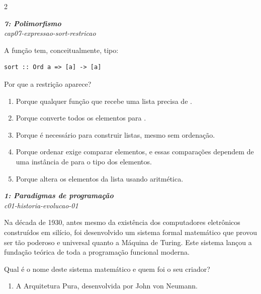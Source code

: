 \documentclass[a4paper,10pt,brazil]{article}
\begin{document}
\begin{multicols}{2}
\begin{enumerate}
\end{enumerate}

\begin{flushright}
  \footnotesize
  \textit{\textbf{7: Polimorfismo}}\\
  \textit{cap07-expressao-sort-restricao}\\

\end{flushright}
A função  tem, conceitualmente, tipo:

\begin{verbatim}
sort :: Ord a => [a] -> [a]
\end{verbatim}

Por que a restrição  aparece?

\begin{enumerate}
  \item Porque qualquer função que recebe uma lista precisa de .
  \item Porque  converte todos os elementos para .
  \item Porque  é necessário para construir listas, mesmo sem ordenação.
  \item Porque ordenar exige comparar elementos, e essas comparações dependem de uma instância de  para o tipo dos elementos.
  \item Porque  altera os elementos da lista usando aritmética.

\end{enumerate}

\begin{flushright}
  \footnotesize
  \textit{\textbf{1: Paradigmas de programação}}\\
  \textit{c01-historia-evolucao-01}\\

\end{flushright}
Na década de 1930, antes mesmo da existência dos computadores eletrônicos construídos em silício, foi desenvolvido um sistema formal matemático que provou ser tão poderoso e universal quanto a Máquina de Turing. Este sistema lançou a fundação teórica de toda a programação funcional moderna.

Qual é o nome deste sistema matemático e quem foi o seu criador?

\begin{enumerate}
  \item A Arquitetura Pura, desenvolvida por John von Neumann.


\end{enumerate}
\end{multicols}
\end{document}

